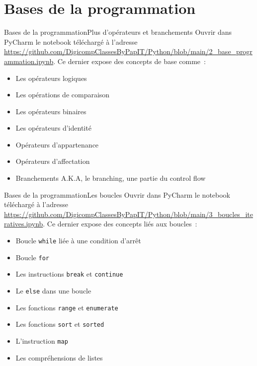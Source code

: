 \documentclass{beamer}
\begin{document}
    \section{Bases de la programmation}\label{sec:programming-basics}

    \begin{frame}{Bases de la programmation}{Plus d'opérateurs et branchements}
        Ouvrir dans PyCharm le notebook téléchargé à l'adresse \url{https://github.com/DigicompClassesByPapIT/Python/blob/main/2_base_programmation.ipynb}.
        \bigbreak
        Ce dernier expose des concepts de base comme~:
        \begin{itemize}
            \item Les opérateurs logiques
            \item Les opérations de comparaison
            \item Les opérateurs binaires
            \item Les opérateurs d'identité
            \item Opérateurs d'appartenance
            \item Opérateurs d'affectation
            \item Branchements A.K.A, le branching, une partie du control flow
        \end{itemize}
    \end{frame}

    \begin{frame}{Bases de la programmation}{Les boucles}
        Ouvrir dans PyCharm le notebook téléchargé à l'adresse \url{https://github.com/DigicompClassesByPapIT/Python/blob/main/3_boucles_iteratives.ipynb}.
        \bigbreak
        Ce dernier expose des concepts liés aux boucles~:
        \begin{itemize}
            \item Boucle \lstinline{while} liée à une condition d'arrêt
            \item Boucle \lstinline{for}
            \item Les instructions \lstinline{break} et \lstinline{continue}
            \item Le \lstinline{else} dans une boucle
            \item Les fonctions \lstinline{range} et \lstinline{enumerate}
            \item Les fonctions \lstinline{sort} et \lstinline{sorted}
            \item L'instruction \lstinline{map}
            \item Les compréhensions de listes
        \end{itemize}
    \end{frame}
\end{document}
